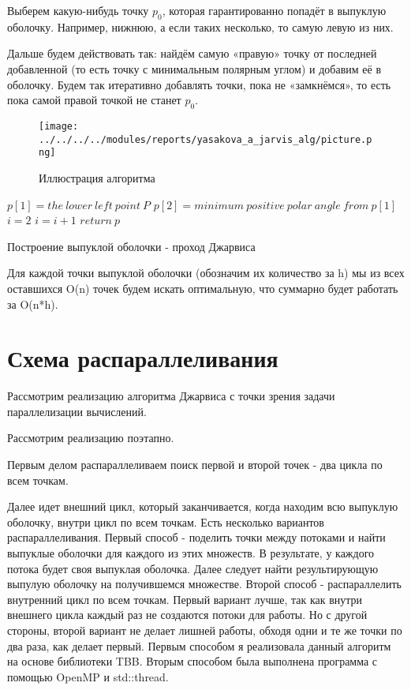 \documentclass{article}
\newenvironment{myalgorithm}[1][htb]
  {\renewcommand{\algorithmcfname}{Алгоритм}
   \begin{algorithm}[#1]%
  }{\end{algorithm}}
\begin{document}
\par Выберем какую-нибудь точку $p_{0}$, которая гарантированно попадёт в выпуклую оболочку. Например, нижнюю, а если таких несколько, то самую левую из них.

\par Дальше будем действовать так: найдём самую «правую» точку от последней добавленной (то есть точку с минимальным полярным углом) и добавим её в оболочку. Будем так итеративно добавлять точки, пока не «замкнёмся», то есть пока самой правой точкой не станет $p_{0}$.

\begin{figure}[h]
\centering
\texttt{[image: ../../../../modules/reports/yasakova\_a\_jarvis\_alg/picture.png]}
\caption{Иллюстрация алгоритма}
\end{figure}

\begin{myalgorithm}[H]
\SetAlgoLined
\BlankLine
$p[1] = the\:lower\:left\:point\:P$\;
$p[2] =minimum\:positive\:polar\:angle\:from\:p[1]$\;
$i = 2$\;
\BlankLine
{} {
	$i = i + 1$\;
}
$return\:p$\;
\caption{Построение выпуклой оболочки - проход Джарвиса}
\end{myalgorithm}

\par Для каждой точки выпуклой оболочки (обозначим их количество за h) мы из всех оставшихся O(n) точек будем искать оптимальную, что суммарно будет работать за O(n*h).


\newpage

\section{Схема распараллеливания}

Рассмотрим реализацию алгоритма Джарвиса с точки зрения задачи параллелизации вычислений.

\par Рассмотрим реализацию поэтапно.

\par Первым делом распараллеливаем поиск первой и второй точек - два цикла по всем точкам.

\par Далее идет внешний цикл, который заканчивается, когда находим всю выпуклую оболочку, внутри цикл по всем точкам. Есть несколько вариантов распараллеливания. Первый способ - поделить точки между потоками и найти выпуклые оболочки для каждого из этих множеств. В результате, у каждого потока будет своя выпуклая оболочка. Далее следует найти результирующую выпулую оболочку на получившемся множестве. Второй способ - распараллелить внутренний цикл по всем точкам. Первый вариант лучше, так как внутри внешнего цикла каждый раз не создаются потоки для работы. Но с другой стороны, второй вариант не делает лишней работы, обходя одни и те же точки по два раза, как делает первый. Первым способом я реализовала данный алгоритм на основе библиотеки TBB. Вторым способом была выполнена программа с помощью OpenMP и std::thread.
\end{document}
